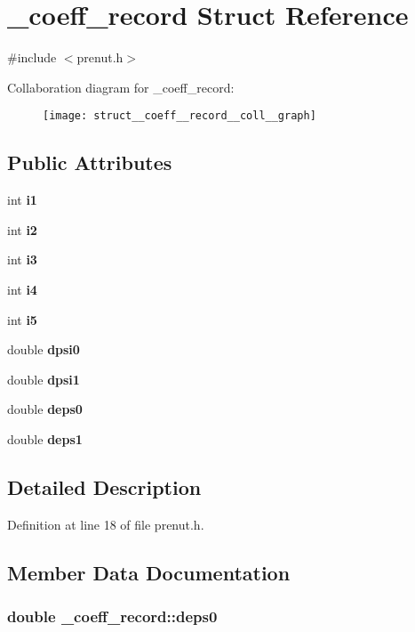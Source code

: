 \section{\-\_\-coeff\-\_\-record \-Struct \-Reference}
\label{struct__coeff__record}


{\ttfamily \#include $<$prenut.\-h$>$}



\-Collaboration diagram for \-\_\-coeff\-\_\-record\-:\nopagebreak
\begin{figure}[H]
\begin{center}
\leavevmode
\texttt{[image: struct\_\_coeff\_\_record\_\_coll\_\_graph]}
\end{center}
\end{figure}
\subsection*{\-Public \-Attributes}
\begin{DoxyCompactItemize}
\item 
int {\bf i1}
\item 
int {\bf i2}
\item 
int {\bf i3}
\item 
int {\bf i4}
\item 
int {\bf i5}
\item 
double {\bf dpsi0}
\item 
double {\bf dpsi1}
\item 
double {\bf deps0}
\item 
double {\bf deps1}
\end{DoxyCompactItemize}


\subsection{\-Detailed \-Description}


\-Definition at line 18 of file prenut.\-h.



\subsection{\-Member \-Data \-Documentation}
\subsubsection[{deps0}]{\setlength{\rightskip}{0pt plus 5cm}double {\bf \-\_\-coeff\-\_\-record\-::deps0}}\label{struct__coeff__record_acbe46502ed00c85951b61cece826cb68}


